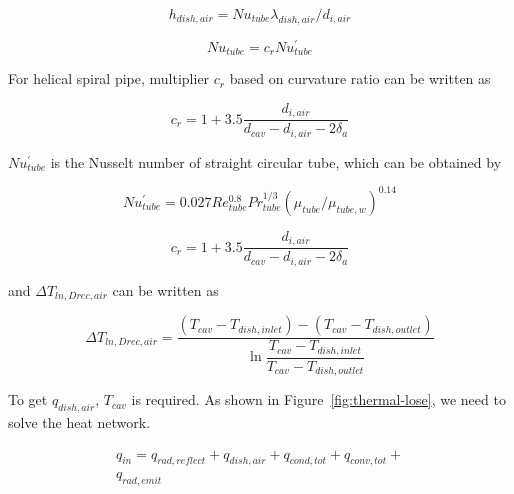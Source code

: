 \documentclass{article}
\begin{document}
\begin{equation*}
	h_{dish,air}=Nu_{tube}\lambda_{dish,air}/d_{i,air}
\end{equation*}

\begin{equation*}
	Nu_{tube}=c_rNu_{tube}^{'}
\end{equation*}

For helical spiral pipe, multiplier $c_r$ based on curvature ratio can be written as~\cite{Pablo2008}

\begin{equation*}
	c_{r}=1+3.5\frac{d_{i,air}}{d_{cav}-d_{i,air}-2\delta_{a}}
\end{equation*}

$Nu_{tube}^{'}$ is the Nusselt number of straight circular tube, which can be obtained by~\cite{Serth2007}

\begin{equation*}
	Nu_{tube}^{'}= 0.027Re_{tube}^{0.8}Pr_{tube}^{1/3}(\mu_{tube}/\mu_{tube,w})^{0.14}
\end{equation*}

\begin{equation*}
	c_{r}=1+3.5\frac{d_{i,air}}{d_{cav}-d_{i,air}-2\delta_{a}}
\end{equation*}

and $\Delta{}T_{ln,Drec,air}$ can be written as

\begin{equation*}
	\Delta{}T_{ln,Drec,air}=\frac{(T_{cav}-T_{dish,inlet})-(T_{cav}-T_{dish,outlet})}{\ln\dfrac{T_{cav}-T_{dish,inlet}}{T_{cav}-T_{dish,outlet}}}
\end{equation*}

To get $q_{dish,air}$, $T_{cav}$ is required. As shown in Figure~\ref{fig:thermal-lose}, we need to solve the heat network.

\begin{equation}
\begin{aligned}
	q_{in} = q_{rad,reflect}+q_{dish,air}+q_{cond,tot}+q_{conv,tot}+
	\\q_{rad,emit}\label{eq:q_in sum}
\end{aligned}
\end{equation}
\end{document}
